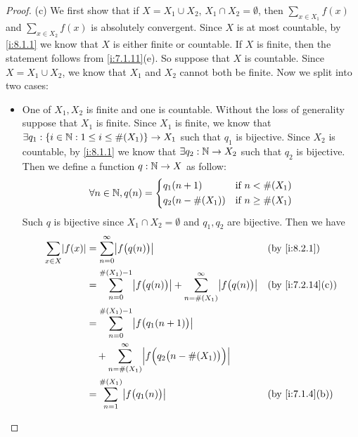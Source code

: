 \begin{proof}{(c)}
  We first show that if \(X = X_1 \cup X_2\), \(X_1 \cap X_2 = \emptyset\), then \(\sum_{x \in X_1} f(x)\) and \(\sum_{x \in X_2} f(x)\) is absolutely convergent.
  Since \(X\) is at most countable, by \cref{i:8.1.1} we know that \(X\) is either finite or countable.
  If \(X\) is finite, then the statement follows from \cref{i:7.1.11}(e).
  So suppose that \(X\) is countable.
  Since \(X = X_1 \cup X_2\), we know that \(X_1\) and \(X_2\) cannot both be finite.
  Now we split into two cases:
  \begin{itemize}
    \item One of \(X_1, X_2\) is finite and one is countable.
          Without the loss of generality suppose that \(X_1\) is finite.
          Since \(X_1\) is finite, we know that \(\exists q_1 : \left\lbrace i \in \mathbb{N} : 1 \leq i \leq \#(X_1)\right\rbrace \to X_1\) such that \(q_1\) is bijective.
          Since \(X_2\) is countable, by \cref{i:8.1.1} we know that \(\exists q_2 : \mathbb{N} \to X_2\) such that \(q_2\) is bijective.
          Then we define a function \(q : \mathbb{N} \to X\) as follow:
          \[
            \forall n \in \mathbb{N}, q(n) = \begin{dcases}
              q_1(n + 1)       & \text{if } n < \#(X_1)    \\
              q_2(n - \#(X_1)) & \text{if } n \geq \#(X_1)
            \end{dcases}
          \]
          Such \(q\) is bijective since \(X_1 \cap X_2 = \emptyset\) and \(q_1, q_2\) are bijective.
          Then we have
          \begin{align*}
            \sum_{x \in X} \abs{f(x)} & = \sum_{n = 0}^\infty \abs{f\big(q(n)\big)}                                                          &  & \by{i:8.2.1}     \\
                                      & = \sum_{n = 0}^{\#(X_1) - 1} \abs{f\big(q(n)\big)} + \sum_{n = \#(X_1)}^\infty \abs{f\big(q(n)\big)} &  & \by{i:7.2.14}[c] \\
                                      & = \sum_{n = 0}^{\#(X_1) - 1} \abs{f\big(q_1(n + 1)\big)}                                                                   \\
                                      & \quad + \sum_{n = \#(X_1)}^\infty \abs{f\Big(q_2\big(n - \#(X_1)\big)\Big)}                                                \\
                                      & = \sum_{n = 1}^{\#(X_1)} \abs{f\big(q_1(n)\big)}                                                     &  & \by{i:7.1.4}[b]  \\

\end{align*}
\end{itemize}
\end{proof}

